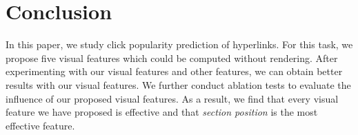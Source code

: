 \section{Conclusion}

In this paper, we study click popularity prediction of hyperlinks. For this task, we propose five visual features which could be computed without rendering. After experimenting with our visual features and other features, we can obtain better results with our visual features. We further conduct ablation tests to evaluate the influence of our proposed visual features. As a result, we find that every visual feature we have proposed is effective and that \emph{section position} is the most effective feature.